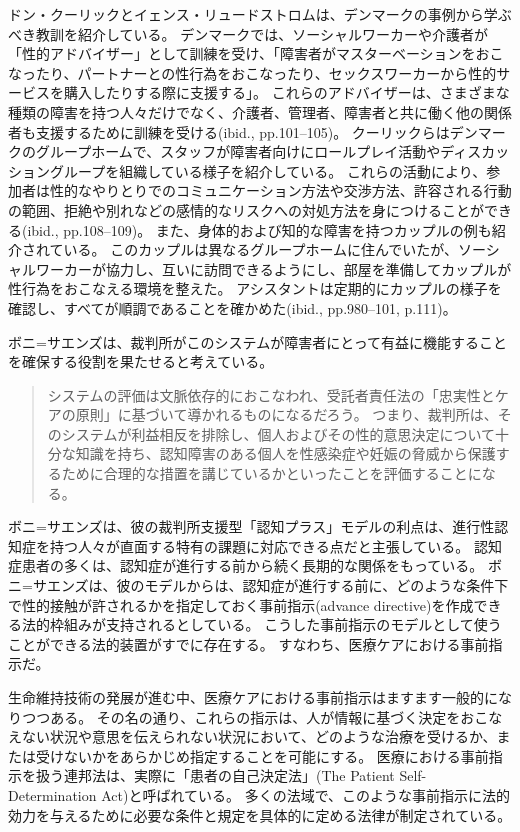 \documentclass[paper=a4,book,openany]{jlreq}
\begin{document}
ドン・クーリックとイェンス・リュードストロムは、デンマークの事例から学ぶべき教訓を紹介している。
デンマークでは、ソーシャルワーカーや介護者が「性的アドバイザー」として訓練を受け、「障害者がマスターベーションをおこなったり、パートナーとの性行為をおこなったり、セックスワーカーから性的サービスを購入したりする際に支援する」\citep[p.18]{kulick15:_lonel_its_oppos}。
これらのアドバイザーは、さまざまな種類の障害を持つ人々だけでなく、介護者、管理者、障害者と共に働く他の関係者も支援するために訓練を受ける(ibid., pp.101--105)。
クーリックらはデンマークのグループホームで、スタッフが障害者向けにロールプレイ活動やディスカッショングループを組織している様子を紹介している。
これらの活動により、参加者は性的なやりとりでのコミュニケーション方法や交渉方法、許容される行動の範囲、拒絶や別れなどの感情的なリスクへの対処方法を身につけることができる(ibid., pp.108--109)。
また、身体的および知的な障害を持つカップルの例も紹介されている。
このカップルは異なるグループホームに住んでいたが、ソーシャルワーカーが協力し、互いに訪問できるようにし、部屋を準備してカップルが性行為をおこなえる環境を整えた。
アシスタントは定期的にカップルの様子を確認し、すべてが順調であることを確かめた(ibid., pp.980--101, p.111)。

ボニ=サエンズは、裁判所がこのシステムが障害者にとって有益に機能することを確保する役割を果たせると考えている。

\begin{quote}
システムの評価は文脈依存的におこなわれ、受託者責任法の「忠実性とケアの原則」に基づいて導かれるものになるだろう。
つまり、裁判所は、そのシステムが利益相反を排除し、個人およびその性的意思決定について十分な知識を持ち、認知障害のある個人を性感染症や妊娠の脅威から保護するために合理的な措置を講じているかといったことを評価することになる。
\citep[p.1234]{boni-saenz15:_sexual_incap}
\end{quote}

ボニ=サエンズは、彼の裁判所支援型「認知プラス」モデルの利点は、進行性認知症を持つ人々が直面する特有の課題に対応できる点だと主張している。
認知症患者の多くは、認知症が進行する前から続く長期的な関係をもっている。
ボニ=サエンズは、彼のモデルからは、認知症が進行する前に、どのような条件下で性的接触が許されるかを指定しておく事前指示(advance directive)を作成できる法的枠組みが支持されるとしている。
こうした事前指示のモデルとして使うことができる法的装置がすでに存在する。
すなわち、医療ケアにおける事前指示だ。

生命維持技術の発展が進む中、医療ケアにおける事前指示はますます一般的になりつつある。
その名の通り、これらの指示は、人が情報に基づく決定をおこなえない状況や意思を伝えられない状況において、どのような治療を受けるか、または受けないかをあらかじめ指定することを可能にする。
医療における事前指示を扱う連邦法は、実際に「患者の自己決定法」(The Patient Self-Determination Act)と呼ばれている。
多くの法域で、このような事前指示に法的効力を与えるために必要な条件と規定を具体的に定める法律が制定されている\citep[cf.][]{srebnik99:_advan_direc_mental_healt_treat}。
\end{document}
